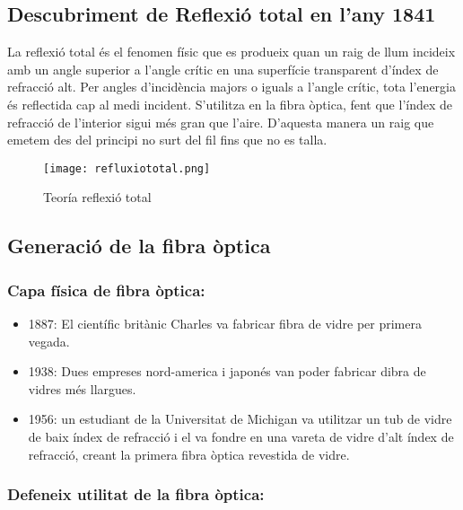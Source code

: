
\subsection*{Descubriment de Reflexió total en l'any 1841}

La reflexió total és el fenomen físic que es produeix quan un raig de llum incideix amb un angle superior a l'angle crític en una superfície transparent d'índex de refracció alt. Per angles d'incidència majors o iguals a l'angle crític, tota l'energia és reflectida cap al medi incident.
S'utilitza en la fibra òptica, fent que l'índex de refracció de l'interior sigui més gran que l'aire. D'aquesta manera un raig que emetem des del principi no surt del fil fins que no es talla. 

\begin{figure}[h!]
    \centering
    \texttt{[image: refluxiototal.png]}
    \caption{Teoría reflexió total}
\end{figure}


\subsection*{Generació de la fibra òptica}

\subsubsection*{Capa física de fibra òptica:}

\begin{itemize}
    \item 1887: El científic britànic Charles va fabricar fibra de vidre per primera vegada.
    \item 1938: Dues empreses nord-america i japonés van poder fabricar dibra de vidres més llargues.
    \item 1956: un estudiant de la Universitat de Michigan va utilitzar un tub de vidre de baix índex de refracció i el va fondre en una vareta de vidre d'alt índex de refracció, creant la primera fibra òptica revestida de vidre. 

\end{itemize}

\subsubsection*{Defeneix utilitat de la fibra òptica:}

